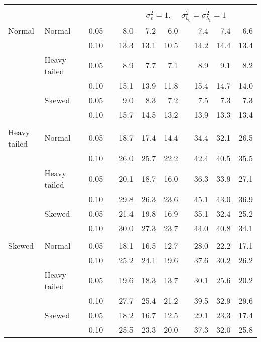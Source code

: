 \begin{table}[ht]
\begin{scriptsize}
\begin{tabular}{ll p{.1cm} c p{.1cm} rrr p{.1cm} rrr}
&&&&&&&&&&&\\
& && && \multicolumn{7}{c}{$\sigma_{\varepsilon}^2 = 1$, \ \ $\sigma_{b_0}^2 = \sigma_{b_1}^2 = 1$} \\ \cline{6-12}
\rowcolor{gray!20} Normal & Normal &  & 0.05 &  & 8.0 & 7.2 & 6.0 &  & 7.4 & 7.4 & 6.6 \\ 
\rowcolor{gray!20}    &  &  & 0.10 &  & 13.3 & 13.1 & 10.5 &  & 14.2 & 14.4 & 13.4 \\ 
\rowcolor{gray!20}    & Heavy tailed &  & 0.05 &  & 8.9 & 7.7 & 7.1 &  & 8.9 & 9.1 & 8.2 \\ 
\rowcolor{gray!20}    &  &  & 0.10 &  & 15.1 & 13.9 & 11.8 &  & 15.4 & 14.7 & 14.0 \\ 
\rowcolor{gray!20}    & Skewed &  & 0.05 &  & 9.0 & 8.3 & 7.2 &  & 7.5 & 7.3 & 7.3 \\ 
\rowcolor{gray!20}    &  &  & 0.10 &  & 15.7 & 14.5 & 13.2 &  & 13.9 & 13.3 & 13.4 \\ 
&&&&&&&&&&&\\
  Heavy tailed & Normal &  & 0.05 &  & 18.7 & 17.4 & 14.4 &  & 34.4 & 32.1 & 26.5 \\ 
   &  &  & 0.10 &  & 26.0 & 25.7 & 22.2 &  & 42.4 & 40.5 & 35.5 \\ 
   & Heavy tailed &  & 0.05 &  & 20.1 & 18.7 & 16.0 &  & 36.3 & 33.9 & 27.1 \\ 
   &  &  & 0.10 &  & 29.8 & 26.3 & 23.6 &  & 45.1 & 43.0 & 36.9 \\ 
   & Skewed &  & 0.05 &  & 21.4 & 19.8 & 16.9 &  & 35.1 & 32.4 & 25.2 \\ 
   &  &  & 0.10 &  & 30.0 & 27.3 & 23.7 &  & 44.0 & 40.8 & 34.1 \\ 
&&&&&&&&&&&\\
  Skewed & Normal &  & 0.05 &  & 18.1 & 16.5 & 12.7 &  & 28.0 & 22.2 & 17.1 \\ 
   &  &  & 0.10 &  & 25.2 & 24.1 & 19.6 &  & 37.6 & 30.2 & 26.2 \\ 
   & Heavy tailed &  & 0.05 &  & 19.6 & 18.3 & 13.7 &  & 30.1 & 25.6 & 20.2 \\ 
   &  &  & 0.10 &  & 27.7 & 25.4 & 21.2 &  & 39.5 & 32.9 & 29.6 \\ 
   & Skewed &  & 0.05 &  & 18.2 & 16.7 & 12.5 &  & 29.1 & 23.3 & 17.4 \\ 
   &  &  & 0.10 &  & 25.5 & 23.3 & 20.0 &  & 37.3 & 32.0 & 25.8 \\ 



\end{tabular}
\end{scriptsize}
\end{table}
